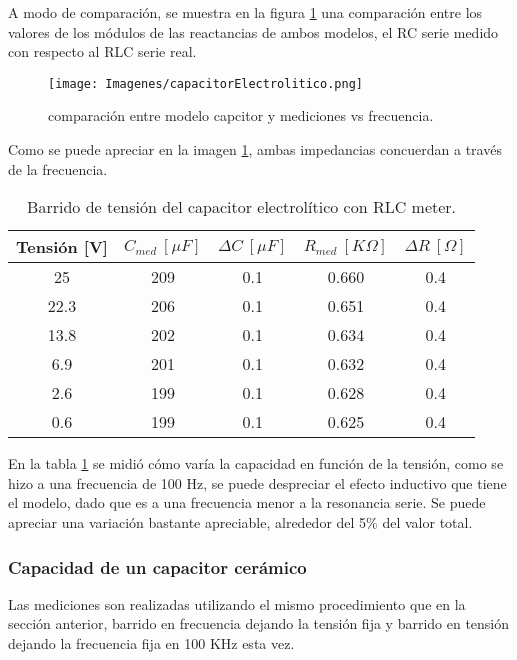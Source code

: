 \documentclass[a4paper,10pt]{article}
\begin{document}
		\indent A modo de comparación, se muestra en la figura \ref{img:002}
		una comparación entre los valores de los módulos de las reactancias de 
		ambos modelos, el RC serie medido con respecto al RLC serie real.
		
		\begin{figure}[!htb]
			\centering
			\texttt{[image: Imagenes/capacitorElectrolitico.png]}
			\caption{comparación entre modelo capcitor y mediciones vs 
			frecuencia.}
			\label{img:002} 
		\end{figure}
		
		\indent Como se puede apreciar en la imagen \ref{img:002}, ambas 
		impedancias concuerdan a través de la frecuencia.
		
		\begin{table}[!htp]
			\centering
			\begin{tabular}{|c|c|c|c|c|}
				\hline
				Tensión [V] & $C_{med}~[\mu F]$ & $\Delta C~[\mu F]$ & 
				$R_{med}~[K\Omega]$ & $\Delta R~[\Omega]$\\
				\hline
				25 &	209 & 0.1 & 0.660 & 0.4 \\
				\hline
				22.3 &	206 & 0.1 & 0.651 & 0.4 \\
				\hline
				13.8 &	202 & 0.1 & 0.634 & 0.4 \\
				\hline
				6.9 &	201 & 0.1 & 0.632 & 0.4 \\
				\hline
				2.6 &	199 & 0.1 & 0.628 & 0.4 \\
				\hline
				0.6 &	199 & 0.1 & 0.625 & 0.4 \\
				\hline	  
			\end{tabular}
			\caption{Barrido de tensión del capacitor electrolítico con RLC 
			meter.} 
			\label{tab:003}
		\end{table}	

		\indent En la tabla \ref{tab:003} se midió cómo varía la capacidad en 
		función de la tensión, como se hizo a una frecuencia de 100 Hz, se puede
		despreciar el efecto inductivo que tiene el modelo, dado que es a una 
		frecuencia menor a la resonancia serie. Se puede apreciar una variación 
		bastante apreciable, alrededor del 5\% del valor total.
		
		\subsubsection{Capacidad de un capacitor cer\'amico}
		\indent Las mediciones son realizadas utilizando el mismo procedimiento
		que en la sección anterior, barrido en frecuencia dejando la tensión 
		fija y barrido en tensión dejando la frecuencia fija en 100 KHz esta 
		vez. \\
		
\end{document}
